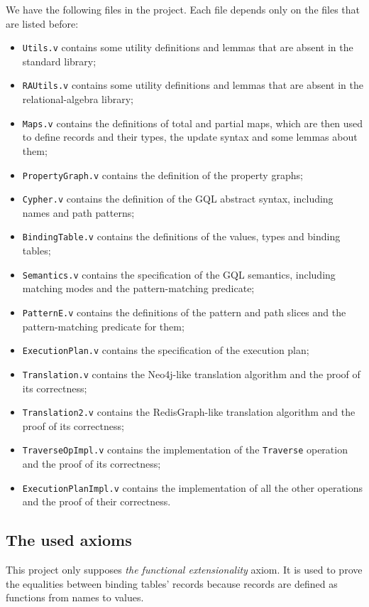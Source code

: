 \documentclass[14pt]{constructor-thesis}
\theoremstyle{definition}
\begin{document}
We have the following files in the project. Each file depends only on the files that are listed before:
\begin{itemize}
  \item \texttt{Utils.v} contains some utility definitions and lemmas that are absent in the standard library;
  \item \texttt{RAUtils.v} contains some utility definitions and lemmas that are absent in the relational-algebra library;
  \item \texttt{Maps.v} contains the definitions of total and partial maps, which are then used to define records and their types, the update syntax and some lemmas about them;
  \item \texttt{PropertyGraph.v} contains the definition of the property graphs;
  \item \texttt{Cypher.v} contains the definition of the GQL abstract syntax, including names and path patterns;
  \item \texttt{BindingTable.v} contains the definitions of the values, types and binding tables;
  \item \texttt{Semantics.v} contains the specification of the GQL semantics, including matching modes and the pattern-matching predicate;
  \item \texttt{PatternE.v} contains the definitions of the pattern and path slices and the pattern-matching predicate for them;
  \item \texttt{ExecutionPlan.v} contains the specification of the execution plan;
  \item \texttt{Translation.v} contains the Neo4j-like translation algorithm and the proof of its correctness;
  \item \texttt{Translation2.v} contains the RedisGraph-like translation algorithm and the proof of its correctness;
  \item \texttt{TraverseOpImpl.v} contains the implementation of the \texttt{Traverse} operation and the proof of its correctness;
  \item \texttt{ExecutionPlanImpl.v} contains the implementation of all the other operations and the proof of their correctness.
\end{itemize}

\subsection{The used axioms}

This project only supposes \textit{the functional extensionality} axiom. It is used to prove the equalities between binding tables' records because records are defined as functions from names to values.
\end{document}
